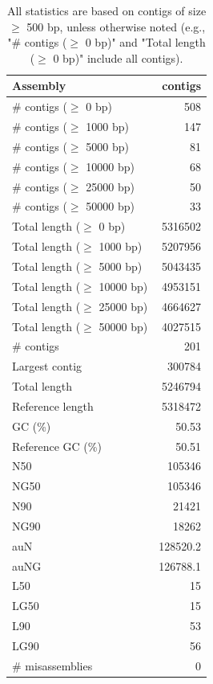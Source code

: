 \documentclass[12pt,a4paper]{article}
\begin{document}
\begin{table}[ht]
\begin{center}
\caption{All statistics are based on contigs of size $\geq$ 500 bp, unless otherwise noted (e.g., "\# contigs ($\geq$ 0 bp)" and "Total length ($\geq$ 0 bp)" include all contigs).}
\begin{tabular}{|l*{1}{|r}|}
\hline
Assembly & contigs \\ \hline
\# contigs ($\geq$ 0 bp) & 508 \\ \hline
\# contigs ($\geq$ 1000 bp) & 147 \\ \hline
\# contigs ($\geq$ 5000 bp) & 81 \\ \hline
\# contigs ($\geq$ 10000 bp) & 68 \\ \hline
\# contigs ($\geq$ 25000 bp) & 50 \\ \hline
\# contigs ($\geq$ 50000 bp) & 33 \\ \hline
Total length ($\geq$ 0 bp) & 5316502 \\ \hline
Total length ($\geq$ 1000 bp) & 5207956 \\ \hline
Total length ($\geq$ 5000 bp) & 5043435 \\ \hline
Total length ($\geq$ 10000 bp) & 4953151 \\ \hline
Total length ($\geq$ 25000 bp) & 4664627 \\ \hline
Total length ($\geq$ 50000 bp) & 4027515 \\ \hline
\# contigs & 201 \\ \hline
Largest contig & 300784 \\ \hline
Total length & 5246794 \\ \hline
Reference length & 5318472 \\ \hline
GC (\%) & 50.53 \\ \hline
Reference GC (\%) & 50.51 \\ \hline
N50 & 105346 \\ \hline
NG50 & 105346 \\ \hline
N90 & 21421 \\ \hline
NG90 & 18262 \\ \hline
auN & 128520.2 \\ \hline
auNG & 126788.1 \\ \hline
L50 & 15 \\ \hline
LG50 & 15 \\ \hline
L90 & 53 \\ \hline
LG90 & 56 \\ \hline
\# misassemblies & 0 \\ \hline

\end{tabular}
\end{center}
\end{table}
\end{document}
